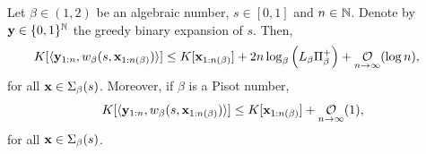 \begin{theorem}\label{thm:lower bound of kolmogorov complexity for beta expansions when beta is algebraic}
    Let $\beta \in (1,2)$ be an algebraic number, $s \in [0,1]$ and $n \in \mathbb{N}$. Denote by ${\bf y} \in \{0,1\}^{\mathbb{N}}$ the greedy binary expansion of $s$. Then,
    \begin{align}\label{eq:algebraic:thm:lower bound of kolmogorov complexity for beta expansions when beta is algebraic}
        K[\langle \yf_{1:n}, w_\beta(s,\xf_{1:\nlogbeta})\rangle] &\leq K[\xf_{1:\nlogbeta}] + 2n \log_\beta\left(L_\beta \Pi_\beta^+\right)
        + \bigOx[\log n]{n},
    \end{align}
for all ${\bf x} \in \Sigma_\beta(s)$. Moreover, if $\beta$ is a Pisot number,
\begin{equation}\label{eq:pisot:thm:lower bound of kolmogorov complexity for beta expansions when beta is algebraic}
    K[\langle \yf_{1:n}, w_\beta(s,\xf_{1:\nlogbeta})\rangle] \leq K[\xf_{1:\nlogbeta}] + \bigOx[1]{n},
\end{equation}
for all ${\bf x} \in \Sigma_\beta(s)$. 
\end{theorem}
